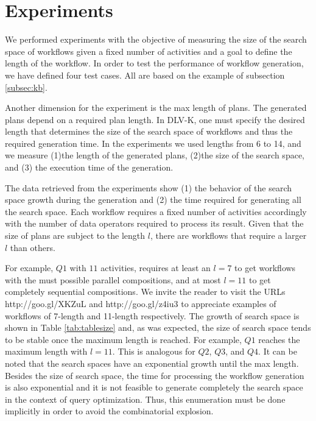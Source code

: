 
\section{Experiments} \label{sec:experiments}

We performed experiments with the objective of measuring the size of the search space of workflows given a fixed number of activities and a goal to define the length of the workflow. In order to test the performance of workflow generation, we have defined four test cases. All are based on the example of subsection \ref{subsec:kb}.
	
Another dimension for the experiment is the max length of plans. The generated plans depend on a required plan length. In DLV-K, one must specify the desired length that determines the size of the search space of workflows and thus the required generation time. In the experiments we used lengths from 6 to 14, and we measure (1)the length of the generated plans, (2)the size of the search space, and (3) the execution time of the generation.

The data retrieved from the experiments show (1) the behavior of the search space growth during the generation and (2) the time required for generating all the search space. Each workflow requires a fixed number of activities accordingly with the number of data operators required to process its result. Given that the size of plans are subject to the length $l$, there are workflows that require a larger $l$ than others.

For example, $Q1$ with $11$ activities, requires at least an $l=7$ to get workflows with the must possible parallel compositions, and at most $l=11$ to get completely sequential compositions. We invite the reader to visit the URLs http://goo.gl/XKZuL and http://goo.gl/z4iu3 to appreciate examples of workflows of 7-length and 11-length respectively. The growth of search space is shown in Table \ref{tab:tablesize} and, as was expected, the size of search space tends to be stable once the maximum length is reached. For example, $Q1$ reaches the maximum length with $l=11$. This is analogous for $Q2$, $Q3$, and $Q4$. It can be noted that the search spaces have an exponential growth until the max length.
Besides the size of search space, the time for processing the workflow generation is also exponential and it is not feasible to generate completely the search space in the context of query optimization. Thus, this enumeration must be done implicitly in order to avoid the combinatorial explosion.





